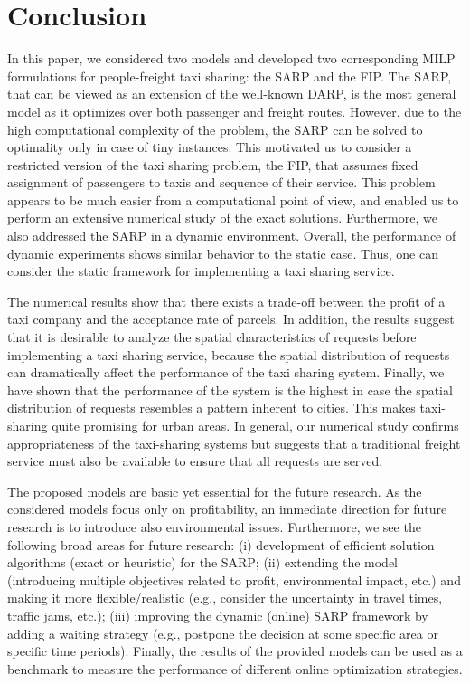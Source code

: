 \documentclass[preprint,authoryear,12pt]{elsarticle}
\begin{document}
\section{Conclusion}\label{sec_conclusions}
In this paper, we considered two models and developed two corresponding MILP formulations for people-freight taxi sharing: the SARP and the FIP. The SARP, that can be viewed as an extension of the well-known DARP, is the most general model as it optimizes over both passenger and freight routes. However, due to the high computational complexity of the problem, the SARP can be solved to optimality only in case of tiny instances. This motivated us to consider a restricted version of the taxi sharing problem, the FIP, that assumes fixed assignment of passengers to taxis and sequence of their service. This problem appears to be much easier from a computational point of view, and enabled us to perform an extensive numerical study of the exact solutions. Furthermore, we also addressed  the SARP in a dynamic environment. Overall, the performance of dynamic experiments shows similar behavior to the static case. Thus, one can consider the static framework for implementing a taxi sharing service. 

The numerical results show that there exists a trade-off between the profit of a taxi company and the acceptance rate of parcels. In addition, the results suggest that it is desirable to analyze the spatial characteristics of requests before implementing a taxi sharing service, because the spatial distribution of requests can dramatically affect the performance of the taxi sharing system. Finally, we have shown that the performance of the system is the highest in case the spatial distribution of requests resembles a pattern inherent to cities. This makes taxi-sharing quite promising for urban areas. In general, our numerical study confirms appropriateness of the taxi-sharing systems but suggests that a traditional freight service must also be available to ensure that all requests are served.

The proposed models are basic yet essential for the future research. As the considered models focus only on profitability, an immediate direction for future research is to introduce also environmental issues. Furthermore, we see the following broad areas for future research: (i) development of efficient solution algorithms (exact or heuristic) for the SARP; (ii) extending the model (introducing multiple objectives related to profit, environmental impact, etc.) and making it more flexible/realistic (e.g., consider the uncertainty in travel times, traffic jams, etc.); (iii) improving the dynamic (online) SARP framework by adding a waiting strategy (e.g., postpone the decision at some specific area or specific time periods). Finally, the results of the provided models can be used as a benchmark to measure the performance of different online optimization strategies.
\end{document}
